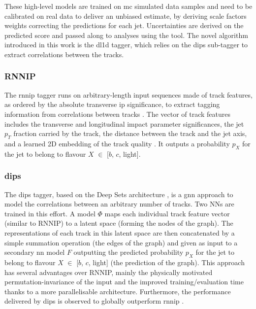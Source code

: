 These high-level models are trained on \gls{mc} simulated data samples and need to be calibrated on real data to deliver an unbiased estimate, by deriving \gls{scale factors} weights correcting the predictions for each jet. Uncertainties are derived on the predicted score and passed along to analyses using the tool. The novel algorithm introduced in this work is the \gls{dl1d} tagger, which relies on the \gls{dips} sub-tagger to extract correlations between the tracks.  

\subsubsection{RNNIP}
The \gls{rnnip} tagger runs on arbitrary-length input sequences made of track features, as ordered by the absolute transverse \gls{ip} significance, to extract tagging information from correlations between tracks \cite{ATL-PHYS-PUB-2017-003}. The vector of track features includes the transverse and longitudinal impact parameter significances, the jet $p_T$ fraction carried by the track, the distance between the track and the jet axis, and a learned 2D embedding of the track quality \cite{Paganini:2289214}. It outputs a probability $p_X$ for the jet to belong to flavour $X$ $\in$ [$b$, $c$, light].

\subsubsection{dips}
The \gls{dips} tagger, based on the Deep Sets architecture \cite{NIPS2017_f22e4747}, is a \gls{gnn} approach to model the correlations between an arbitrary number of tracks. Two NNs are trained in this effort. A model $\Phi$ maps each individual track feature vector (similar to RNNIP) to a latent space (forming the nodes of the graph). The representations of each track in this latent space are then concatenated by a simple summation operation (the edges of the graph) and given as input to a secondary \gls{nn} model $F$ outputting the predicted probability $p_X$ for the jet to belong to flavour $X$ $\in$ [$b$, $c$, light] (the prediction of the graph). This approach has several advantages over RNNIP, mainly the physically motivated permutation-invariance of the input and the improved training/evaluation time thanks to a more parallelisable architecture. Furthermore, the performance delivered by \gls{dips} is observed to globally outperform \gls{rnnip} \cite{ATL-PHYS-PUB-2020-014}. 

